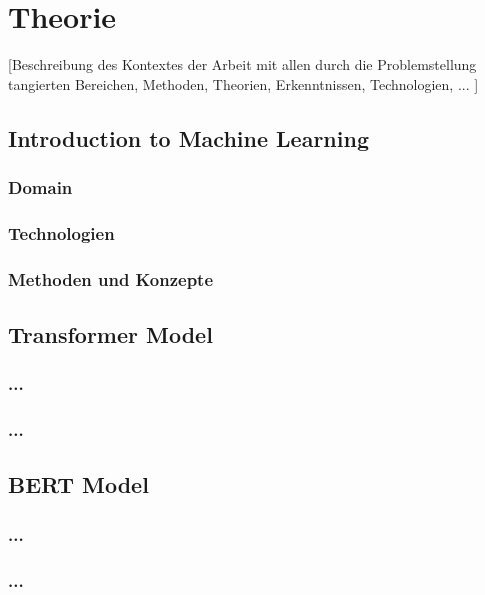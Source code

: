 \documentclass[oneside,bibliography=totocnumbered,BCOR=5mm]{scrbook}%
\theoremstyle{definition}
\theoremstyle{definition}
\theoremstyle{definition}
\theoremstyle{definition}
\theoremstyle{definition}
\theoremstyle{definition}
\begin{document}
\chapter{Theorie}
[Beschreibung des Kontextes der Arbeit mit allen durch die Problemstellung tangierten Bereichen, Methoden, Theorien, Erkenntnissen, Technologien, ... ] 


\section{Introduction to Machine Learning}


\subsection{Domain} 



\subsection{Technologien}


\subsection{Methoden und Konzepte}


\section{Transformer Model}


\subsection{...}


\subsection{...}

\section{BERT Model}


\subsection{...}


\subsection{...}
\end{document}
